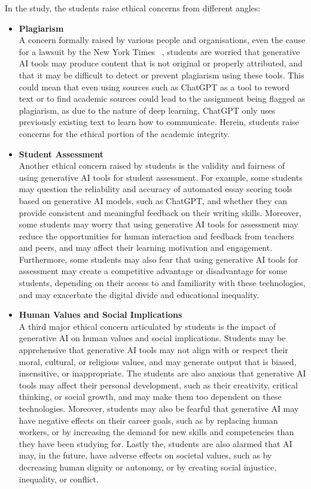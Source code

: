 \documentclass[a4paper,12pt]{report}
\begin{document}
In the study, the students raise ethical concerns from different angles:
\begin{itemize}
    \item \textbf{Plagiarism}\\
    A concern formally raised by various people and organisations, even the cause for a lawsuit by the New York Times ~\cite{bennett2024nytimesopenai}, students are worried that generative AI tools may produce content that is not original or properly attributed, and that it may be difficult to detect or prevent plagiarism using these tools. This could mean that even using sources such as ChatGPT as a tool to reword text or to find academic sources could lead to the assignment being flagged as plagiarism, as due to the nature of deep learning, ChatGPT only uses previously existing text to learn how to communicate. Herein, students raise concerns for the ethical portion of the academic integrity.
    \item \textbf{Student Assessment}\\
    Another ethical concern raised by students is the validity and fairness of using generative AI tools for student assessment. For example, some students may question the reliability and accuracy of automated essay scoring tools based on generative AI models, such as ChatGPT, and whether they can provide consistent and meaningful feedback on their writing skills. Moreover, some students may worry that using generative AI tools for assessment may reduce the opportunities for human interaction and feedback from teachers and peers, and may affect their learning motivation and engagement. Furthermore, some students may also fear that using generative AI tools for assessment may create a competitive advantage or disadvantage for some students, depending on their access to and familiarity with these technologies, and may exacerbate the digital divide and educational inequality.
    \item \textbf{Human Values and Social Implications}\\
    A third major ethical concern articulated by students is the impact of generative AI on human values and social implications. Students may be apprehensive that generative AI tools may not align with or respect their moral, cultural, or religious values, and may generate output that is biased, insensitive, or inappropriate. The students are also anxious that generative AI tools may affect their personal development, such as their creativity, critical thinking, or social growth, and may make them too dependent on these technologies. Moreover, students may also be fearful that generative AI may have negative effects on their career goals, such as by replacing human workers, or by increasing the demand for new skills and competencies than they have been studying for. Lastly the, students are also alarmed that AI may, in the future, have adverse effects on societal values, such as by decreasing human dignity or autonomy, or by creating social injustice, inequality, or conflict.
\end{itemize}
\end{document}

